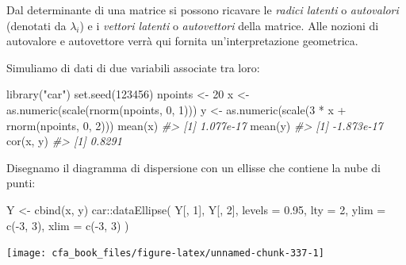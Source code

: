 \documentclass[
  11pt,
]{krantz}
\makeatletter
\newenvironment{Shaded}{\begin{snugshade}}{\end{snugshade}}
\newcommand{\AttributeTok}[1]{\textcolor[rgb]{0.61,0.61,0.61}{#1}}
\newcommand{\CommentTok}[1]{\textcolor[rgb]{0.37,0.37,0.37}{\textit{#1}}}
\newcommand{\DecValTok}[1]{\textcolor[rgb]{0.06,0.06,0.06}{#1}}
\newcommand{\FloatTok}[1]{\textcolor[rgb]{0.06,0.06,0.06}{#1}}
\newcommand{\FunctionTok}[1]{\textcolor[rgb]{0,0,0}{#1}}
\newcommand{\NormalTok}[1]{#1}
\newcommand{\OtherTok}[1]{\textcolor[rgb]{0.37,0.37,0.37}{#1}}
\newcommand{\SpecialCharTok}[1]{\textcolor[rgb]{0,0,0}{#1}}
\newcommand{\StringTok}[1]{\textcolor[rgb]{0.5,0.5,0.5}{#1}}
\newenvironment{kframe}{%
\medskip{}
\setlength{\fboxsep}{.8em}
 \def\at@end@of@kframe{}%
 \ifinner\ifhmode%
  \def\at@end@of@kframe{\end{minipage}}%
  \begin{minipage}{\columnwidth}%
 \fi\fi%
 \def\FrameCommand##1{\hskip\@totalleftmargin \hskip-\fboxsep
 \colorbox{shadecolor}{##1}\hskip-\fboxsep
     \hskip-\linewidth \hskip-\@totalleftmargin \hskip\columnwidth}%
 \MakeFramed {\advance\hsize-\width
   \@totalleftmargin\z@ \linewidth\hsize
   \@setminipage}}%
 {\par\unskip\endMakeFramed%
 \at@end@of@kframe}
\renewenvironment{Shaded}{\begin{kframe}}{\end{kframe}}
\theoremstyle{definition}
\theoremstyle{definition}
\theoremstyle{definition}
\theoremstyle{definition}
\theoremstyle{remark}
\makeatother
\begin{document}
Dal determinante di una matrice si possono ricavare le \emph{radici latenti} o \emph{autovalori} (denotati da \(\lambda_i\)) e i \emph{vettori latenti} o \emph{autovettori} della matrice. Alle nozioni di autovalore e autovettore verrà qui fornita un'interpretazione geometrica.

Simuliamo di dati di due variabili associate tra loro:

\begin{Shaded}
\begin{Highlighting}[]
\FunctionTok{library}\NormalTok{(}\StringTok{"car"}\NormalTok{)}
\FunctionTok{set.seed}\NormalTok{(}\DecValTok{123456}\NormalTok{)}
\NormalTok{npoints }\OtherTok{\textless{}{-}} \DecValTok{20}
\NormalTok{x }\OtherTok{\textless{}{-}} \FunctionTok{as.numeric}\NormalTok{(}\FunctionTok{scale}\NormalTok{(}\FunctionTok{rnorm}\NormalTok{(npoints, }\DecValTok{0}\NormalTok{, }\DecValTok{1}\NormalTok{)))}
\NormalTok{y }\OtherTok{\textless{}{-}} \FunctionTok{as.numeric}\NormalTok{(}\FunctionTok{scale}\NormalTok{(}\DecValTok{3} \SpecialCharTok{*}\NormalTok{ x }\SpecialCharTok{+} \FunctionTok{rnorm}\NormalTok{(npoints, }\DecValTok{0}\NormalTok{, }\DecValTok{2}\NormalTok{)))}
\FunctionTok{mean}\NormalTok{(x)}
\CommentTok{\#\textgreater{} [1] 1.077e{-}17}
\FunctionTok{mean}\NormalTok{(y)}
\CommentTok{\#\textgreater{} [1] {-}1.873e{-}17}
\FunctionTok{cor}\NormalTok{(x, y)}
\CommentTok{\#\textgreater{} [1] 0.8291}
\end{Highlighting}
\end{Shaded}

Disegnamo il diagramma di dispersione con un ellisse che contiene la nube di punti:

\begin{Shaded}
\begin{Highlighting}[]
\NormalTok{Y }\OtherTok{\textless{}{-}} \FunctionTok{cbind}\NormalTok{(x, y)}
\NormalTok{car}\SpecialCharTok{::}\FunctionTok{dataEllipse}\NormalTok{(}
\NormalTok{  Y[, }\DecValTok{1}\NormalTok{], Y[, }\DecValTok{2}\NormalTok{],}
  \AttributeTok{levels =} \FloatTok{0.95}\NormalTok{,}
  \AttributeTok{lty =} \DecValTok{2}\NormalTok{,}
  \AttributeTok{ylim =} \FunctionTok{c}\NormalTok{(}\SpecialCharTok{{-}}\DecValTok{3}\NormalTok{, }\DecValTok{3}\NormalTok{),}
  \AttributeTok{xlim =} \FunctionTok{c}\NormalTok{(}\SpecialCharTok{{-}}\DecValTok{3}\NormalTok{, }\DecValTok{3}\NormalTok{)}
\NormalTok{)}
\end{Highlighting}
\end{Shaded}

\begin{center}\texttt{[image: cfa\_book\_files/figure-latex/unnamed-chunk-337-1]} \end{center}
\end{document}
